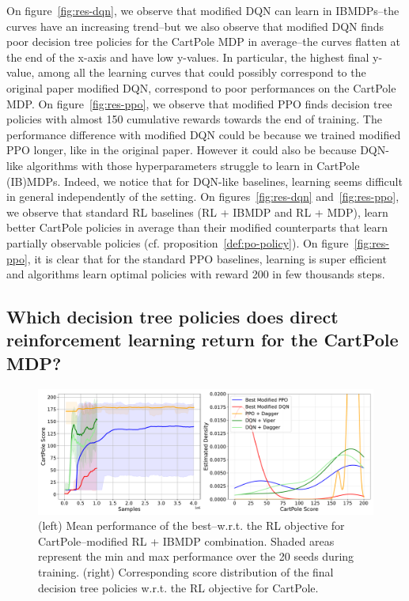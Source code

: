 On figure~\ref{fig:res-dqn}, we observe that modified DQN can learn in IBMDPs--the curves have an increasing trend--but we also observe that modified DQN finds poor decision tree policies for the CartPole MDP in average--the curves flatten at the end of the x-axis and have low y-values.
In particular, the highest final y-value, among all the learning curves that could possibly correspond to the original paper modified DQN, correspond to poor performances on the CartPole MDP.
On figure~\ref{fig:res-ppo}, we observe that modified PPO finds decision tree policies with almost 150 cumulative rewards towards the end of training.
The performance difference with modified DQN could be because we trained modified PPO longer, like in the original paper.
However it could also be because DQN-like algorithms with those hyperparameters struggle to learn in CartPole (IB)MDPs.
Indeed, we notice that for DQN-like baselines, learning seems difficult in general independently of the setting.
On figures~\ref{fig:res-dqn} and~\ref{fig:res-ppo}, we observe that standard RL baselines (RL + IBMDP and RL + MDP), learn better CartPole policies in average than their modified counterparts that learn partially observable policies (cf. proposition~\ref{def:po-policy}). 
On figure~\ref{fig:res-ppo}, it is clear that for the standard PPO baselines, learning is super efficient and algorithms learn optimal policies with reward 200 in few thousands steps.

\subsection{Which decision tree policies does direct reinforcement learning return for the CartPole MDP?}

\begin{figure}
    \centering
    \includegraphics[width=1\textwidth]{images/images_part1/ppo_tree_study.pdf}
    \caption{(left) Mean performance of the best--w.r.t. the RL objective for CartPole--modified RL + IBMDP combination. Shaded areas represent the min and max performance over the 20 seeds during training. (right) Corresponding score distribution of the final decision tree policies w.r.t. the RL objective for CartPole.}\label{fig:ppo-trees}
\end{figure}


